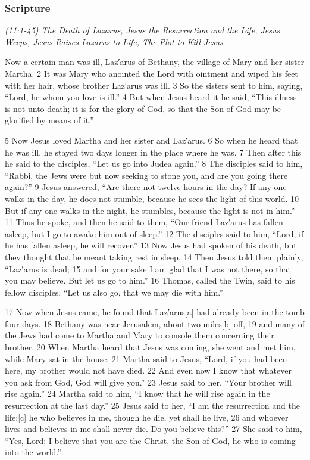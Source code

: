 \documentclass[letterpaper]{report}
\begin{document}
\subsubsection{Scripture}

{\centering
	\emph{(11:1-45) The Death of Lazarus,
		Jesus the Resurrection and the Life,
		Jesus Weeps,
		Jesus Raises Lazarus to Life,
		The Plot to Kill Jesus}\\
}
\begin{multicols}{2}
Now a certain man was ill, Laz′arus of Bethany, the village of Mary and her sister Martha. 2 It was Mary who anointed the Lord with ointment and wiped his feet with her hair, whose brother Laz′arus was ill. 3 So the sisters sent to him, saying, “Lord, he whom you love is ill.” 4 But when Jesus heard it he said, “This illness is not unto death; it is for the glory of God, so that the Son of God may be glorified by means of it.”

5 Now Jesus loved Martha and her sister and Laz′arus. 6 So when he heard that he was ill, he stayed two days longer in the place where he was. 7 Then after this he said to the disciples, “Let us go into Judea again.” 8 The disciples said to him, “Rabbi, the Jews were but now seeking to stone you, and are you going there again?” 9 Jesus answered, “Are there not twelve hours in the day? If any one walks in the day, he does not stumble, because he sees the light of this world. 10 But if any one walks in the night, he stumbles, because the light is not in him.” 11 Thus he spoke, and then he said to them, “Our friend Laz′arus has fallen asleep, but I go to awake him out of sleep.” 12 The disciples said to him, “Lord, if he has fallen asleep, he will recover.” 13 Now Jesus had spoken of his death, but they thought that he meant taking rest in sleep. 14 Then Jesus told them plainly, “Laz′arus is dead; 15 and for your sake I am glad that I was not there, so that you may believe. But let us go to him.” 16 Thomas, called the Twin, said to his fellow disciples, “Let us also go, that we may die with him.”

17 Now when Jesus came, he found that Laz′arus[a] had already been in the tomb four days. 18 Bethany was near Jerusalem, about two miles[b] off, 19 and many of the Jews had come to Martha and Mary to console them concerning their brother. 20 When Martha heard that Jesus was coming, she went and met him, while Mary sat in the house. 21 Martha said to Jesus, “Lord, if you had been here, my brother would not have died. 22 And even now I know that whatever you ask from God, God will give you.” 23 Jesus said to her, “Your brother will rise again.” 24 Martha said to him, “I know that he will rise again in the resurrection at the last day.” 25 Jesus said to her, “I am the resurrection and the life;[c] he who believes in me, though he die, yet shall he live, 26 and whoever lives and believes in me shall never die. Do you believe this?” 27 She said to him, “Yes, Lord; I believe that you are the Christ, the Son of God, he who is coming into the world.”


\end{multicols}
\end{document}
